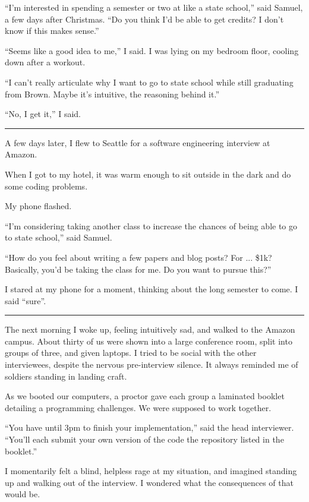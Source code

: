 ``I'm interested in spending a semester or two at like a state school,'' said
Samuel, a few days after Christmas.  ``Do you think I'd be able to get credits?
I don't know if this makes sense.''

``Seems like a good idea to me,'' I said.  I was lying on my bedroom floor,
cooling down after a workout.  

``I can't really articulate why I want to go to state school while still
graduating from Brown.   Maybe it's intuitive, the reasoning behind it.'' 

``No, I get it,'' I said. 

\plainfancybreak{12pt}{2}{* * *}

A few days later, I flew to Seattle for a software engineering interview at
Amazon.

When I got to my hotel, it was warm enough to sit outside in the dark and do
some coding problems.

My phone flashed.

``I'm considering taking another class to increase the chances of being able to
go to state school,'' said Samuel.  

``How do you feel about writing a few papers and blog posts?  For ... \$1k?
Basically, you'd be taking the class for me.  Do you want to pursue this?'' 

I stared at my phone for a moment, thinking about the long semester to come.  I
said ``sure''.

\plainfancybreak{12pt}{2}{* * *}

The next morning I woke up, feeling intuitively sad, and walked to the Amazon
campus.  About thirty of us were shown into a large conference room, split into
groups of three, and given laptops.  I tried to be social with the other
interviewees, despite the nervous pre-interview silence.  It always reminded me of
soldiers standing in landing craft.

As we booted our computers, a proctor gave each group a laminated booklet
detailing a programming challenges.  We were supposed to work together.

``You have until 3pm to finish your implementation,'' said the head interviewer.
``You'll each submit your own version of the code the repository listed in the
booklet.''

I momentarily felt a blind, helpless rage at my situation, and imagined standing
up and walking out of the interview.  I wondered what the consequences of that
would be.  

